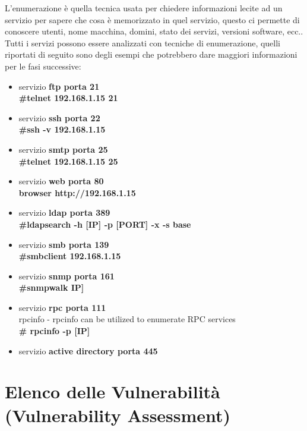 L'enumerazione è quella tecnica usata per chiedere informazioni lecite ad un servizio per sapere che cosa è memorizzato in quel servizio, questo ci permette di conoscere utenti,  nome macchina, domini, stato dei servizi, versioni software, ecc.. \\
Tutti i servizi possono essere analizzati con tecniche di enumerazione, quelli riportati di seguito sono degli esempi che potrebbero dare maggiori informazioni per le fasi successive:
\begin{itemize}

    \item servizio\textbf{ ftp porta 21} \\
        \textbf{ \#telnet  192.168.1.15 21}
    \item servizio \textbf{ssh porta 22} \\
        \textbf{ \#ssh -v 192.168.1.15}
    \item servizio \textbf{smtp porta 25} \\
        \textbf{ \#telnet  192.168.1.15 25}
     \item servizio \textbf{web porta 80} \\
        \textbf{ browser http://192.168.1.15}
    \item servizio \textbf{ldap porta 389} \\
        \textbf{ \#ldapsearch -h [IP] -p [PORT] -x -s base}
    \item servizio\textbf{ smb porta 139} \\
        \textbf{ \#smbclient 192.168.1.15}
    \item servizio\textbf{ snmp porta 161} \\
         \textbf{ \#snmpwalk IP]}
     \item servizio\textbf{ rpc porta 111} \\
        rpcinfo - rpcinfo can be utilized to enumerate RPC services \\
        \textbf{ \# rpcinfo -p [IP]}
    \item servizio\textbf{ active directory porta 445}
\end{itemize}



\section{ Elenco delle Vulnerabilità (Vulnerability Assessment) }

